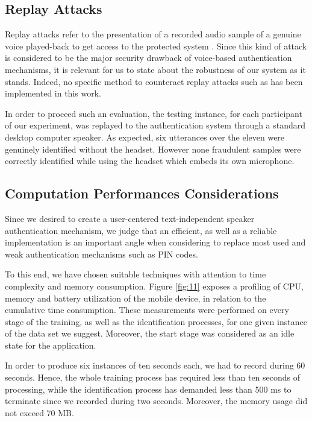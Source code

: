 \documentclass[cryptography,article,submit,moreauthors,pdftex,10pt,a4paper]{mdpi}
\begin{document}
\subsection{Replay Attacks}

Replay attacks refer to the presentation of a recorded audio sample of a genuine voice played-back to get access to the protected system \cite{41}. Since this kind of attack is considered to be the major security drawback of voice-based authentication mechanisms, it is relevant for us to state about the robustness of our system as it stands. Indeed, no specific method to counteract replay attacks such as \cite{42} has been implemented in this work.

In order to proceed such an evaluation, the testing instance, for each participant of our experiment, was replayed to the authentication system through a standard desktop computer speaker. As expected, six utterances over the eleven were genuinely identified without the headset. However none fraudulent samples were correctly identified while using the headset which embeds its own microphone.

\subsection{Computation Performances Considerations}

Since we desired to create a user-centered text-independent speaker authentication mechanism, we judge that an efficient, as well as a reliable implementation is an important angle when considering to replace most used and weak authentication mechanisms such as PIN codes. 

To this end, we have chosen suitable techniques with attention to time complexity and memory consumption. Figure \ref{fig:11} exposes a profiling of CPU, memory and battery utilization of the mobile device, in relation to the cumulative time consumption. These measurements were performed on every stage of the training, as well as the identification processes, for one given instance of the data set we suggest. Moreover, the start stage was considered as an idle state for the application.

In order to produce six instances of ten seconds each, we had to record during 60 seconds. Hence, the whole training process has required less than ten seconds of processing, while the identification process has demanded less than 500 ms to terminate since we recorded during two seconds. Moreover, the memory usage did not exceed 70 MB.
\end{document}
